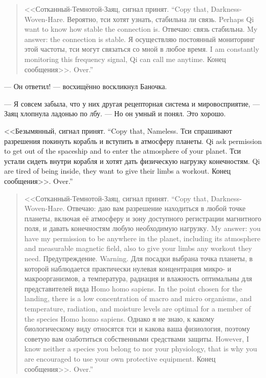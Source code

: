 \begin{quote}
{<<Сотканный-Темнотой-Заяц, сигнал принят.}
{``Copy that, Darkness-Woven-Hare.}
{Вероятно, тси хотят узнать, стабильна ли связь.}
{Perhaps Qi want to know how stable the connection is.}
{Отвечаю: связь стабильна.}
{My answer: the connection is stable.}
{Я осуществляю постоянный мониторинг этой частоты, тси могут связаться со мной в любое время.}
{I am constantly monitoring this frequency signal, Qi can call me anytime.}
{Конец сообщения>>.}
{Over.''}
\end{quote}

--- Он ответил! --- восхищённо воскликнул Баночка.

--- Я совсем забыла, что у них другая рецепторная система и мировосприятие, --- Заяц хлопнула ладонью по лбу.
--- Но он умный и понял.
Это хорошо.

{<<Безымянный, сигнал принят.}
{``Copy that, Nameless.}
{Тси спрашивают разрешения покинуть корабль и вступить в атмосферу планеты.}
{Qi ask permission to get out of the spaceship and to enter the atmosphere of your planet.}
{Тси устали сидеть внутри корабля и хотят дать физическую нагрузку конечностям.}
{Qi are tired of being inside, they want to give their limbs a workout.}
{Конец сообщения>>.}
{Over.''}

\begin{quote}
{<<Сотканный-Темнотой-Заяц, сигнал принят.}
{``Copy that, Darkness-Woven-Hare.}
{Отвечаю: даю вам разрешение находиться в любой точке планеты, включая её атмосферу и зону доступного регистрации магнитного поля, и давать конечностям любую необходимую нагрузку.}
{My answer: you have my permission to be anywhere in the planet, including its atmosphere and measurable magnetic field, also to give your limbs any workout they need.}
{Предупреждение.}
{Warning.}
{Для посадки выбрана точка планеты, в которой наблюдается практически нулевая концентрация микро- и макроорганизмов, а температура, радиация и влажность оптимальны для представителей вида Homo homo sapiens.}
{In the point chosen for the landing, there is a low concentration of macro and micro organisms, and temperature, radiation, and moisture levels are optimal for a member of the species Homo homo sapiens.}
{Однако я не знаю, к какому биологическому виду относятся тси и какова ваша физиология, поэтому советую вам озаботиться собственными средствами защиты.}
{However, I know neither a species you belong to nor your physiology, that is why you are encouraged to use your own protective equipment.}
{Конец сообщения>>.}
{Over.''}
\end{quote}

